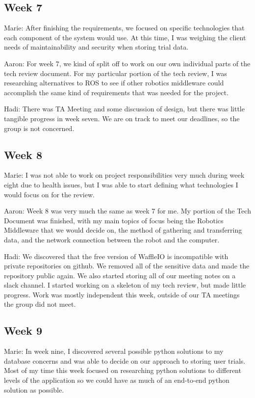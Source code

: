 \documentclass[onecolumn, draftclsnofoot,10pt, compsoc]{IEEEtran}
\begin{document}
\subsection{Week 7}
Marie: After finishing the requirements, we focused on specific technologies that each component of the system would use. At this time, I was weighing the client needs of maintainability and security when storing trial data.\par

Aaron: For week 7, we kind of split off to work on our own individual parts of the tech review document. For my particular portion of the tech review, I was researching alternatives to ROS to see if other robotics middleware could accomplish the same kind of requirements that was needed for the project.\par

Hadi: There was TA Meeting and some discussion of design, but there was little tangible progress in week seven. We are on track to meet our deadlines, so the group is not concerned. \par

\subsection{Week 8}
Marie: I was not able to work on project responsibilities very much during week eight due to health issues, but I was able to start defining what technologies I would focus on for the review.\par

Aaron: Week 8 was very much the same as week 7 for me. My portion of the Tech Document was finished, with my main topics of focus being the Robotics Middleware that we would decide on, the method of gathering and transferring data, and the network connection between the robot and the computer.\par

Hadi: We discovered that the free version of WaffleIO is incompatible with private repositories on github. We removed all of the sensitive data and made the repository public again. We also started storing all of our meeting notes on a slack channel. I started working on a skeleton of my tech review, but made little progress. Work was mostly independent this week, outside of our TA meetings the group did not meet.\par

\subsection{Week 9}
Marie: In week nine, I discovered several possible python solutions to my database concerns and was able to decide on our approach to storing user trials. Most of my time this week focused on researching python solutions to different levels of the application so we could have as much of an end-to-end python solution as possible.\par
\end{document}
